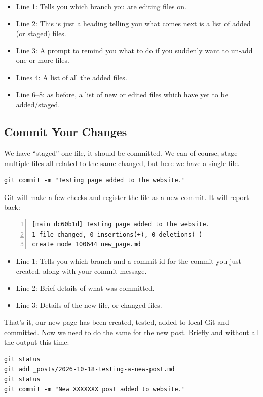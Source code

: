 \begin{itemize}
    \item Line 1: Tells you which branch you are editing files on.
    \item Line 2: This is just a heading telling you what comes next is a list of added (or staged) files.
    \item Line 3: A prompt to remind you what to do if you suddenly want to un-add one or more files.
    \item Lines 4: A list of all the added files.
    \item Line 6--8: as before, a list of new or edited files which have yet to be added/staged.
\end{itemize}

\subsection{Commit Your Changes}

We have ``staged'' one file, it should be committed. We can of course, stage multiple files all related to the same changed, but here we have a single file.

\begin{lstlisting}[style=myText]
git commit -m "Testing page added to the website."
\end{lstlisting}

Git will make a few checks and register the file as a new commit. It will report back:

\begin{lstlisting}[style=myText,numbers=left]
[main dc60b1d] Testing page added to the website.
1 file changed, 0 insertions(+), 0 deletions(-)
create mode 100644 new_page.md
\end{lstlisting}

\begin{itemize}
    \item Line 1: Tells you which branch and a commit id for the commit you just created, along with your commit message.
    \item Line 2: Brief details of what was committed.
    \item Line 3: Details of the new file, or changed files.
\end{itemize}

That's it, our new page has been created, tested, added to local Git and committed. Now we need to do the same for the new post. Briefly and without all the output this time:

\begin{lstlisting}[style=myText]
git status
git add _posts/2026-10-18-testing-a-new-post.md
git status
git commit -m "New XXXXXXX post added to website."
\end{lstlisting}

